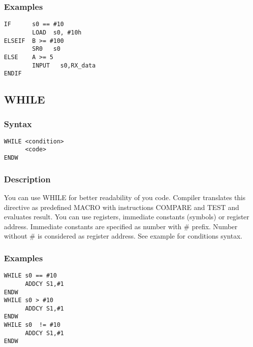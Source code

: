        \subsubsection{Examples}
            \verb'IF      s0 == #10'\\
            \verb'        LOAD  s0, #10h'\\
            \verb'ELSEIF  B >= #100'\\
            \verb'        SR0   s0'\\
            \verb'ELSE    A >= 5'\\
            \verb'        INPUT   s0,RX_data'\\
            \verb'ENDIF'

    \subsection{WHILE}
        \subsubsection{Syntax}
            \verb'WHILE <condition>'\\
            \verb'      <code>'\\
            \verb'ENDW'

        \subsubsection{Description}
            You can use WHILE for better readability of you code. Compiler translates this directive as predefined MACRO with instructions COMPARE and TEST and evaluates result. You can use registers, immediate constants (symbols) or register address. Immediate constants are specified as number with \# prefix. Number without \# is considered as register address. See example for conditions syntax.

        \subsubsection{Examples}
            \verb'WHILE s0 == #10'\\
            \verb'      ADDCY S1,#1'\\
            \verb'ENDW'
            \verb''\\
            \verb'WHILE s0 > #10'\\
            \verb'      ADDCY S1,#1'\\
            \verb'ENDW'
            \verb''\\
            \verb'WHILE s0  != #10'\\
            \verb'      ADDCY S1,#1'\\
            \verb'ENDW'

